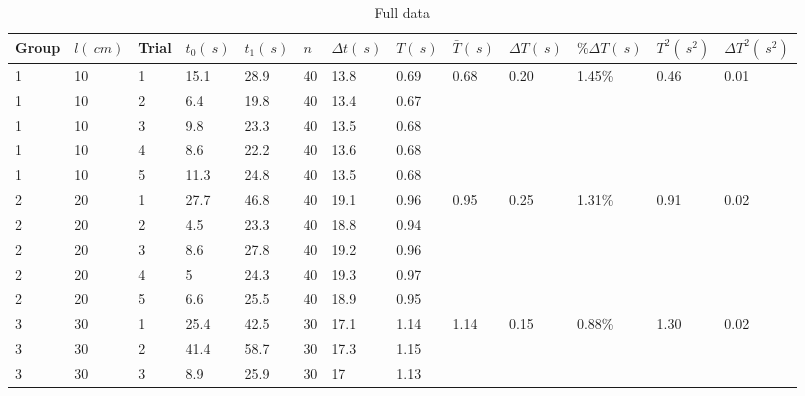 \documentclass[a4paper]{article}
\newcommand{\grayrow}{\rowcolor[gray]{0.925}}
\begin{document}
\clearpage



\begin{table}
    \centering
    \caption{Full data}
    \label{tab.full}
    \begin{tabularx}{\textwidth}{ X X X X X X X X X X X X X }
    \hline
        Group & $l(\SI{}{cm})$ & Trial &  $t_0(\SI{}{s})$ &  $t_1(\SI{}{s})$ & $n$ & $\Delta t(\SI{}{s})$ &  $T(\SI{}{s})$ & $\bar{T}(\SI{}{s})$ & $\Delta T(\SI{}{s})$ & $\%\Delta T(\SI{}{s})$ & $T^2(\SI{}{s^2})$ & $\Delta T^2(\SI{}{s^2})$  \\ \hline
        \grayrow 1 & 10 & 1 & 15.1 & 28.9 & 40 & 13.8 & 0.69  & 0.68  & 0.20  & 1.45\% & 0.46  & 0.01   \\ %
        1 & 10 & 2 & 6.4 & 19.8 & 40 & 13.4 & 0.67  & ~ & ~ & ~ & ~ &   \\ %
        \grayrow 1 & 10 & 3 & 9.8 & 23.3 & 40 & 13.5 & 0.68  & ~ & ~ & ~ & ~ &   \\ %
        1 & 10 & 4 & 8.6 & 22.2 & 40 & 13.6 & 0.68  & ~ & ~ & ~ & ~ &   \\ %
        \grayrow 1 & 10 & 5 & 11.3 & 24.8 & 40 & 13.5 & 0.68  & ~ & ~ & ~ & ~ &   \\ %
        2 & 20 & 1 & 27.7 & 46.8 & 40 & 19.1 & 0.96  & 0.95  & 0.25  & 1.31\% & 0.91  & 0.02   \\ %
        \grayrow 2 & 20 & 2 & 4.5 & 23.3 & 40 & 18.8 & 0.94  & ~ & ~ & ~ & ~ &   \\ %
        2 & 20 & 3 & 8.6 & 27.8 & 40 & 19.2 & 0.96  & ~ & ~ & ~ & ~ &   \\ %
        \grayrow 2 & 20 & 4 & 5 & 24.3 & 40 & 19.3 & 0.97  & ~ & ~ & ~ & ~ &   \\ %
        2 & 20 & 5 & 6.6 & 25.5 & 40 & 18.9 & 0.95  & ~ & ~ & ~ & ~ &   \\ %
        \grayrow 3 & 30 & 1 & 25.4 & 42.5 & 30 & 17.1 & 1.14  & 1.14  & 0.15  & 0.88\% & 1.30  & 0.02   \\ %
        3 & 30 & 2 & 41.4 & 58.7 & 30 & 17.3 & 1.15  & ~ & ~ & ~ & ~ &   \\ %
        \grayrow 3 & 30 & 3 & 8.9 & 25.9 & 30 & 17 & 1.13  & ~ & ~ & ~ & ~ &   \\ %

\end{tabularx}
\end{table}
\end{document}
